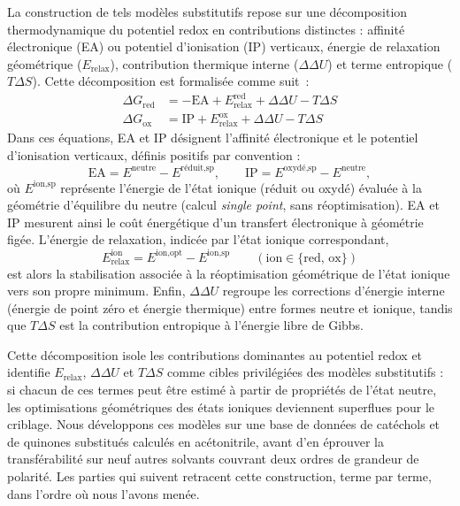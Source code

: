 La construction de tels modèles substitutifs repose sur une décomposition thermodynamique du potentiel redox en contributions distinctes : affinité électronique (EA) ou potentiel d'ionisation (IP) verticaux, énergie de relaxation géométrique ($E_{\text{relax}}$), contribution thermique interne ($\Delta\Delta U$) et terme entropique ($T\Delta S$). Cette décomposition est formalisée comme suit~:
\label{sec:decomposition}
\begin{align}
\Delta G_{\text{red}} &= -\text{EA} + E_{\text{relax}}^{\text{red}} + \Delta\Delta U - T\Delta S \label{eq:decomposition_red} \\
\Delta G_{\text{ox}}  &= \text{IP} + E_{\text{relax}}^{\text{ox}} + \Delta\Delta U - T\Delta S \label{eq:decomposition_ox}
\end{align}
Dans ces équations, EA et IP désignent l'affinité électronique et le potentiel d'ionisation verticaux, définis positifs par convention :
\[
\text{EA} = E^{\text{neutre}} - E^{\text{réduit,sp}}, \qquad \text{IP} = E^{\text{oxydé,sp}} - E^{\text{neutre}},
\]
où $E^{\text{ion,sp}}$ représente l'énergie de l'état ionique (réduit ou oxydé) évaluée à la géométrie d'équilibre du neutre (calcul \emph{single point}, sans réoptimisation). EA et IP mesurent ainsi le coût énergétique d'un transfert électronique à géométrie figée. L'énergie de relaxation, indicée par l'état ionique correspondant,
\[
E_{\text{relax}}^{\text{ion}} = E^{\text{ion,opt}} - E^{\text{ion,sp}} \qquad (\text{ion} \in \{\text{red},\, \text{ox}\})
\]
est alors la stabilisation associée à la réoptimisation géométrique de l'état ionique vers son propre minimum. Enfin, $\Delta\Delta U$ regroupe les corrections d'énergie interne (énergie de point zéro et énergie thermique) entre formes neutre et ionique, tandis que $T\Delta S$ est la contribution entropique à l'énergie libre de Gibbs.

Cette décomposition isole les contributions dominantes au potentiel redox et identifie $E_{\text{relax}}$, $\Delta\Delta U$ et $T\Delta S$ comme cibles privilégiées des modèles substitutifs : si chacun de ces termes peut être estimé à partir de propriétés de l'état neutre, les optimisations géométriques des états ioniques deviennent superflues pour le criblage. Nous développons ces modèles sur une base de données de catéchols et de quinones substitués calculés en acétonitrile, avant d'en éprouver la transférabilité sur neuf autres solvants couvrant deux ordres de grandeur de polarité. Les parties qui suivent retracent cette construction, terme par terme, dans l'ordre où nous l'avons menée.
